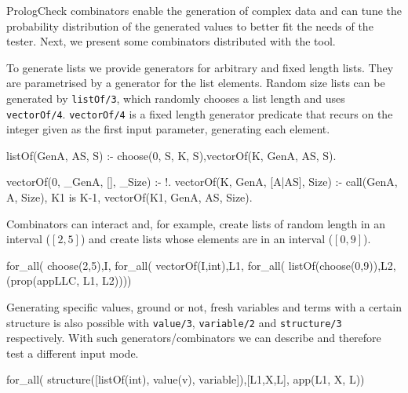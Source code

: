\documentclass[runningheads,a4paper]{../../PaperStyles/llncs}
\newcommand{\yap}[1]{\lstinline[style=yap]{#1}}
\newcommand{\plqc}[0]{{\sf PrologCheck}}
\begin{document}
\plqc{} combinators enable the generation of complex data and can tune
the probability distribution of the generated values to better fit the
needs of the tester.
%
Next, we present some combinators distributed with the tool.



%
To generate lists we provide generators for arbitrary and
fixed length lists.
%
They are parametrised by a generator for the list elements.
%
Random size lists can be generated by \yap{listOf/3}, which randomly
chooses a list length and uses \yap{vectorOf/4}. 
%
\yap{vectorOf/4} is a fixed length generator predicate that recurs on
the integer given as the first input parameter, generating each element.
\begin{yapcode}
 listOf(GenA, AS, S) :- choose(0, S, K, S),vectorOf(K, GenA, AS, S).

 vectorOf(0, _GenA, [], _Size) :- !.
 vectorOf(K, GenA, [A|AS], Size) :-
   call(GenA, A, Size), K1 is K-1, vectorOf(K1, GenA, AS, Size).
\end{yapcode}
%
Combinators can interact and, for example, create lists of random length
in an interval ($[2,5]$) and create lists whose elements are in an
interval ($[0,9]$).
%
\begin{yapcode}
   for_all( choose(2,5),I, for_all( vectorOf(I,int),L1,
     for_all( listOf(choose(0,9)),L2, (prop({appLLC, L1, L2}))))
\end{yapcode}


Generating specific values, ground or not, fresh variables and terms
with a certain structure is also possible with \yap{value/3},
\yap{variable/2} and \yap{structure/3} respectively.
%
With such generators/combinators we can describe and therefore test a
different input mode.
\begin{yapcode}
   for_all( structure([listOf(int), value(v), variable]),[L1,X,L],
     app(L1, X, L))
\end{yapcode}




\end{document}
